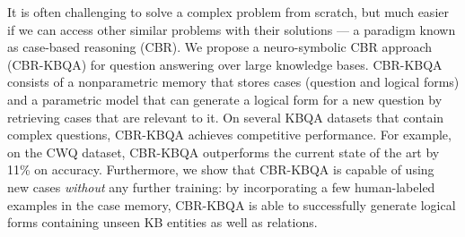 It is often challenging to solve a complex problem from scratch, but much easier if we can access other similar problems with their solutions --- a paradigm known as case-based reasoning (CBR). We propose a neuro-symbolic CBR approach (CBR-KBQA) for question answering over large knowledge bases. CBR-KBQA consists of a nonparametric memory that stores cases (question and logical forms) and a parametric model that can generate a logical form for a new question by retrieving cases that are relevant to it. On several KBQA datasets that contain complex questions, CBR-KBQA achieves competitive performance. For example, on the CWQ dataset, CBR-KBQA outperforms the current state of the art by 11\% on accuracy. Furthermore, we show that CBR-KBQA is capable of using new cases \emph{without} any further training: by incorporating a few human-labeled examples in the case memory, CBR-KBQA is able to successfully generate logical forms containing unseen KB entities as well as relations.
